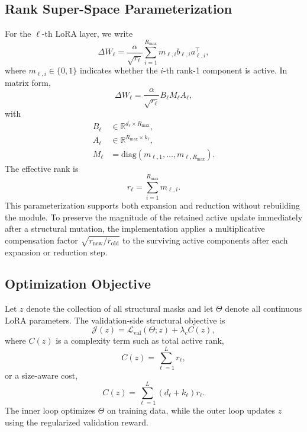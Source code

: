 \documentclass{article}
\newcommand{\Rmax}{R_{\max}}
\begin{document}
\subsection{Rank Super-Space Parameterization}
For the $\ell$-th LoRA layer, we write
\begin{equation}
    \Delta W_\ell = \frac{\alpha}{\sqrt{r_\ell}}\sum_{i=1}^{\Rmax} m_{\ell,i} b_{\ell,i} a_{\ell,i}^{\top},
\end{equation}
where $m_{\ell,i} \in \{0,1\}$ indicates whether the $i$-th rank-1 component is active. In matrix form,
\begin{equation}
    \Delta W_\ell = \frac{\alpha}{\sqrt{r_\ell}} B_\ell M_\ell A_\ell,
\end{equation}
with
\begin{equation}
\begin{aligned}
    B_\ell &\in \mathbb{R}^{d_\ell \times \Rmax}, \\
    A_\ell &\in \mathbb{R}^{\Rmax \times k_\ell}, \\
    M_\ell &= \mathrm{diag}(m_{\ell,1}, \dots, m_{\ell,\Rmax}).
\end{aligned}
\end{equation}
The effective rank is
\begin{equation}
    r_\ell = \sum_{i=1}^{\Rmax} m_{\ell,i}.
\end{equation}
This parameterization supports both expansion and reduction without rebuilding the module. To preserve the magnitude of the retained active update immediately after a structural mutation, the implementation applies a multiplicative compensation factor $\sqrt{r_{\mathrm{new}}/r_{\mathrm{old}}}$ to the surviving active components after each expansion or reduction step.

\subsection{Optimization Objective}
Let $z$ denote the collection of all structural masks and let $\Theta$ denote all continuous LoRA parameters. The validation-side structural objective is
\begin{equation}
    \mathcal{J}(z) = \mathcal{L}_{\mathrm{val}}(\Theta; z) + \lambda_c C(z),
\end{equation}
where $C(z)$ is a complexity term such as total active rank,
\begin{equation}
    C(z) = \sum_{\ell=1}^{L} r_\ell,
\end{equation}
or a size-aware cost,
\begin{equation}
    C(z) = \sum_{\ell=1}^{L}(d_\ell + k_\ell)r_\ell.
\end{equation}
The inner loop optimizes $\Theta$ on training data, while the outer loop updates $z$ using the regularized validation reward.
\end{document}
